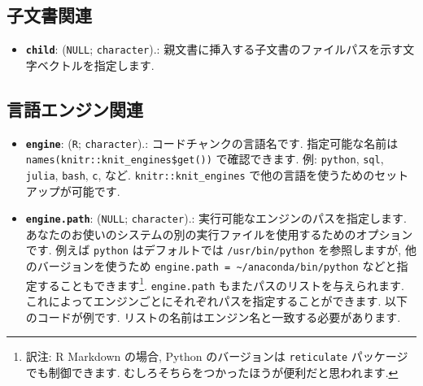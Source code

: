 \documentclass[
]{bxjsreport}
\newenvironment{Shaded}{\begin{snugshade}}{\end{snugshade}}
\newcommand{\AttributeTok}[1]{\textcolor[rgb]{0.77,0.63,0.00}{#1}}
\newcommand{\FunctionTok}[1]{\textcolor[rgb]{0.00,0.00,0.00}{#1}}
\newcommand{\NormalTok}[1]{#1}
\newcommand{\SpecialCharTok}[1]{\textcolor[rgb]{0.00,0.00,0.00}{#1}}
\newcommand{\StringTok}[1]{\textcolor[rgb]{0.31,0.60,0.02}{#1}}
\providecommand{\tightlist}{%
  \setlength{\itemsep}{0pt}\setlength{\parskip}{0pt}}
\begin{document}
\hypertarget{child-document}{%
\subsection{子文書関連}\label{child-document}}

\begin{itemize}
\tightlist
\item
  \textbf{\texttt{child}}: (\texttt{NULL}; \texttt{character}).:
  親文書に挿入する子文書のファイルパスを示す文字ベクトルを指定します.
\end{itemize}

\hypertarget{engine}{%
\subsection{言語エンジン関連}\label{engine}}

\begin{itemize}
\tightlist
\item
  \textbf{\texttt{engine}}:
  (\texttt{\textquotesingle{}R\textquotesingle{}}; \texttt{character}).:
  コードチャンクの言語名です. 指定可能な名前は
  \texttt{names(knitr::knit\_engines\$get())} で確認できます. 例:
  \texttt{python}, \texttt{sql}, \texttt{julia}, \texttt{bash},
  \texttt{c}, など. \texttt{knitr::knit\_engines}
  で他の言語を使うためのセットアップが可能です.
\item
  \textbf{\texttt{engine.path}}: (\texttt{NULL}; \texttt{character}).:
  実行可能なエンジンのパスを指定します.
  あなたのお使いのシステムの別の実行ファイルを使用するためのオプションです.
  例えば \texttt{python} はデフォルトでは \texttt{/usr/bin/python}
  を参照しますが, 他のバージョンを使うため
  \texttt{engine.path\ =\ \textquotesingle{}\textasciitilde{}/anaconda/bin/python\textquotesingle{}}
  などと指定することもできます\footnote{訳注: R Markdown の場合, Python
    のバージョンは \texttt{reticulate} パッケージでも制御できます.
    むしろそちらをつかったほうが便利だと思われます.}.
  \texttt{engine.path} もまたパスのリストを与えられます.
  これによってエンジンごとにそれぞれパスを指定することができます.
  以下のコードが例です.
  リストの名前はエンジン名と一致する必要があります.
\end{itemize}

\begin{Shaded}
\end{Shaded}
\end{document}
